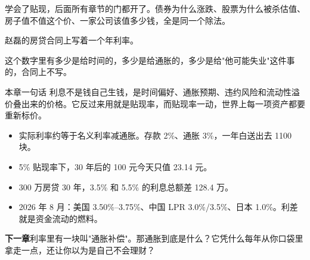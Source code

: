 \bookbreak

学会了贴现，后面所有章节的门都开了。债券为什么涨跌、股票为什么被杀估值、房子值不值这个价、一家公司该值多少钱，全是同一个除法。

赵磊的房贷合同上写着一个年利率。

这个数字里有多少是给时间的，多少是给通胀的，多少是给"他可能失业"这件事的，合同上不写。

\begin{takeaway}{本章一句话}
利息不是钱自己生钱，是时间偏好、通胀预期、违约风险和流动性溢价叠出来的价格。它反过来用就是贴现率，而贴现率一动，世界上每一项资产都要重新标价。

\begin{itemize}
  \item 实际利率约等于名义利率减通胀。存款 2\%、通胀 3\%，一年白送出去 1100 块。
  \item 5\% 贴现率下，30 年后的 100 元今天只值 23.14 元。
  \item 300 万房贷 30 年，3.5\% 和 5.5\% 的利息总额差 128.4 万。
  \item 2026 年 8 月：美国 3.50\%–3.75\%、中国 LPR 3.0\%/3.5\%、日本 1.0\%。利差就是资金流动的燃料。
\end{itemize}

\end{takeaway}

\begin{bridgebox}
\textbf{下一章}利率里有一块叫"通胀补偿"。那通胀到底是什么？它凭什么每年从你口袋里拿走一点，还让你以为是自己不会理财？
\end{bridgebox}

